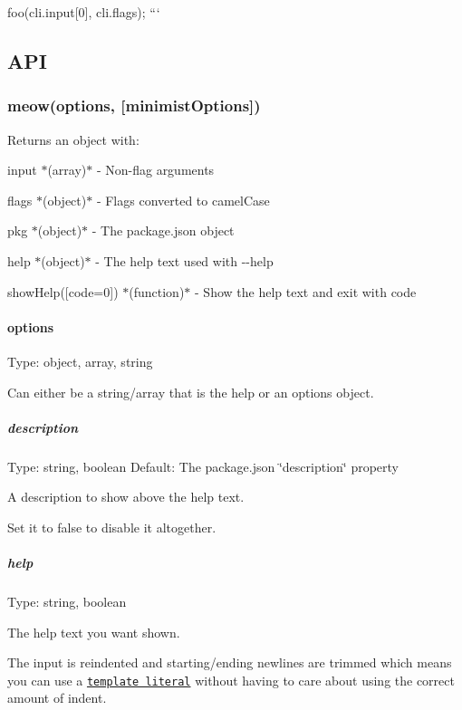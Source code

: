 foo(cli.\+input\mbox{[}0\mbox{]}, cli.\+flags); ```

\subsection*{A\+PI}

\subsubsection*{meow(options, \mbox{[}minimist\+Options\mbox{]})}

Returns an object with\+:


\begin{DoxyItemize}
\item {\ttfamily input} $\ast$(array)$\ast$ -\/ Non-\/flag arguments
\item {\ttfamily flags} $\ast$(object)$\ast$ -\/ Flags converted to camel\+Case
\item {\ttfamily pkg} $\ast$(object)$\ast$ -\/ The {\ttfamily package.\+json} object
\item {\ttfamily help} $\ast$(object)$\ast$ -\/ The help text used with {\ttfamily -\/-\/help}
\item {\ttfamily show\+Help(\mbox{[}code=0\mbox{]})} $\ast$(function)$\ast$ -\/ Show the help text and exit with {\ttfamily code}
\end{DoxyItemize}

\paragraph*{options}

Type\+: {\ttfamily object}, {\ttfamily array}, {\ttfamily string}

Can either be a string/array that is the {\ttfamily help} or an options object.

\subparagraph*{description}

Type\+: {\ttfamily string}, {\ttfamily boolean} Default\+: The package.\+json {\ttfamily \char`\"{}description\char`\"{}} property

A description to show above the help text.

Set it to {\ttfamily false} to disable it altogether.

\subparagraph*{help}

Type\+: {\ttfamily string}, {\ttfamily boolean}

The help text you want shown.

The input is reindented and starting/ending newlines are trimmed which means you can use a \href{https://developer.mozilla.org/en/docs/Web/JavaScript/Reference/template_strings}{\tt template literal} without having to care about using the correct amount of indent.

